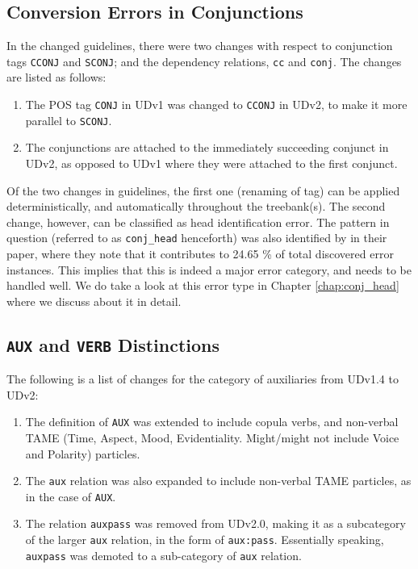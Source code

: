 \subsection{Conversion Errors in Conjunctions}
\label{sssec:conj_head}

In the changed guidelines, there were two changes with respect to conjunction tags \verb|CCONJ| and \verb|SCONJ|; and the dependency relations, \verb|cc| and \verb|conj|. The changes are listed as follows:

\begin{enumerate}
    \item The POS tag \verb|CONJ| in UDv1 was changed to \verb|CCONJ| in UDv2, to make it more parallel to \verb|SCONJ|.
    \item The conjunctions are attached to the immediately succeeding conjunct in UDv2, as opposed to UDv1 where they were attached to the first conjunct.
\end{enumerate}

Of the two changes in guidelines, the first one (renaming of tag) can be applied deterministically, and automatically throughout the treebank(s). The second change, however, can be classified as head identification error. The pattern in question (referred to as \texttt{conj\_head} henceforth) was also identified by \cite{alzetta2017dangerous} in their paper, where they note that it contributes to 24.65 \% of total discovered error instances. This implies that this is indeed a major error category, and needs to be handled well. We do take a look at this error type in Chapter \ref{chap:conj_head} where we discuss about it in detail.

\subsection{\texttt{AUX} and \texttt{VERB} Distinctions}
\label{ssec:AuxVERB}

The following is a list of changes for the category of auxiliaries from UDv1.4 to UDv2:

\begin{enumerate}
    \item The definition of \verb|AUX| was extended to include copula verbs, and non-verbal TAME (Time, Aspect, Mood, Evidentiality. Might/might not include Voice and Polarity) particles.
    \item The \verb|aux| relation was also expanded to include non-verbal TAME particles, as in the case of \verb|AUX|.
    \item The relation \verb|auxpass| was removed from UDv2.0, making it as a subcategory of the larger \verb|aux| relation, in the form of \verb|aux:pass|. Essentially speaking, \verb|auxpass| was demoted to a sub-category of \verb|aux| relation.
\end{enumerate}

